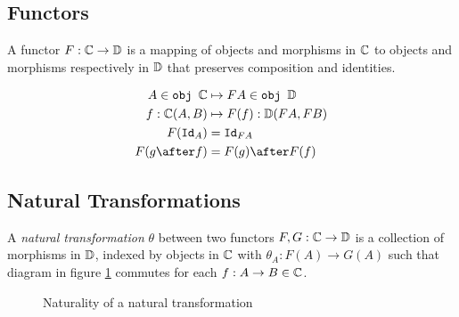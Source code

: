 \documentclass{Report}
\begin{document}



\subsection{Functors}
A functor $F: \mathbb{C} \rightarrow \mathbb{D}$ is a mapping of objects and morphisms in $\mathbb{C}$ to objects and morphisms respectively in $\mathbb{D}$ that preserves composition and identities.

\begin{align*}
    A\in\obj\C &\mapsto FA \in \obj\DC\\
    f: \C(A, B) &\mapsto F(f): \DC(FA, FB)\\
    F(\Id{A}) & = \Id{FA} \\
    F(g\after f) & = F(g)\after F(f)
\end{align*}

\subsection{Natural Transformations}

A \textit{natural transformation} $\theta$ between two functors $F, G: \mathbb{C} \rightarrow \mathbb{D}$ is a collection of morphisms in $\mathbb{D}$, indexed by objects in $\mathbb{C}$ with  $\theta_A: F(A) \rightarrow G(A)$ such that diagram in figure \ref{Naturality} commutes for each $f: A \rightarrow B \in \mathbb{C}$.

\begin{figure}
    \centering
    \begin{minipage}{0.45\textwidth}
        \centering
        \begin{framed}
    \end{framed}
        \caption{Naturality of a natural transformation}
        \label{Naturality}
    \end{minipage}\hfill
\end{figure}
\end{document}
